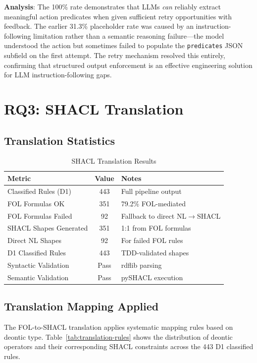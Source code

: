 \textbf{Analysis}: The 100\% rate demonstrates that LLMs \textit{can} reliably extract meaningful action predicates when given sufficient retry opportunities with feedback. The earlier 31.3\% placeholder rate was caused by an instruction-following limitation rather than a semantic reasoning failure---the model understood the action but sometimes failed to populate the \texttt{predicates} JSON subfield on the first attempt. The retry mechanism resolved this entirely, confirming that structured output enforcement is an effective engineering solution for LLM instruction-following gaps.

\section{RQ3: SHACL Translation}

\subsection{Translation Statistics}

\begin{table}[H]
\centering
\caption{SHACL Translation Results}
\label{tab:shacl-results}
\begin{tabular}{|l|c|l|}
\hline
\textbf{Metric} & \textbf{Value} & \textbf{Notes} \\
\hline
Classified Rules (D1) & 443 & Full pipeline output \\
FOL Formulas OK & 351 & 79.2\% FOL-mediated \\
FOL Formulas Failed & 92 & Fallback to direct NL$\rightarrow$SHACL \\
SHACL Shapes Generated & 351 & 1:1 from FOL formulas \\
Direct NL Shapes & 92 & For failed FOL rules \\
D1 Classified Rules & 443 & TDD-validated shapes \\
Syntactic Validation & Pass & rdflib parsing \\
Semantic Validation & Pass & pySHACL execution \\
\hline
\end{tabular}
\end{table}

\subsection{Translation Mapping Applied}

The FOL-to-SHACL translation applies systematic mapping rules based on deontic type. Table~\ref{tab:translation-rules} shows the distribution of deontic operators and their corresponding SHACL constraints across the 443 D1 classified rules.

